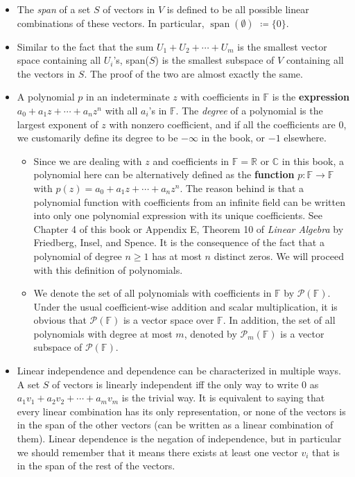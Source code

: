 \documentclass{article}
\newcommand{\R}{\mathbb{R}}
\newcommand{\C}{\mathbb{C}}
\newcommand{\F}{\mathbb{F}}
\newcommand{\s}{\operatorname{span}}
\begin{document}
\begin{itemize}
    \item The \textit{span} of a set $S$ of vectors in $V$ is defined to be all possible linear combinations of these vectors. In particular, $\s(\emptyset)$ $\coloneqq \{0\}$.
    \item Similar to the fact that the sum $U_1 + U_2 +\cdots+ U_m$ is the smallest vector space containing all $U_i$'s, span($S$) is the smallest subspace of $V$ containing all the vectors in $S$. The proof of the two are almost exactly the same.
    \item A polynomial $p$ in an indeterminate $z$ with coefficients in $\F$ is the \textbf{expression} $a_0 + a_1 z + \cdots + a_n z^n$ with all $a_i$'s in $\F$. The \textit{degree} of a polynomial is the largest exponent of $z$ with nonzero coefficient, and if all the coefficients are 0, we customarily define its degree to be $-\infty$ in the book, or $-1$ elsewhere.
    \begin{itemize}
        \item Since we are dealing with $z$ and coefficients in $\F = \R$ or $\C$ in this book, a polynomial here can be alternatively defined as the \textbf{function} $p: \F \rightarrow \F$ with $p(z) = a_0 + a_1 z + \cdots + a_n z^n$. The reason behind is that a polynomial function with coefficients from an infinite field can be written into only one polynomial expression with its unique coefficients. See Chapter 4 of this book or Appendix E, Theorem 10 of \textit{Linear Algebra} by Friedberg, Insel, and Spence. It is the consequence of the fact that a polynomial of degree $n \geq 1$ has at most $n$ distinct zeros. We will proceed with this definition of polynomials.
        \item We denote the set of all polynomials with coefficients in $\F$ by $\mathcal{P}(\F)$. Under the usual coefficient-wise addition and scalar multiplication, it is obvious that $\mathcal{P}(\F)$ is a vector space over $\F$. In addition, the set of all polynomials with degree at most $m$, denoted by $\mathcal{P}_m(\F)$ is a vector subspace of $\mathcal{P}(\F)$.
    \end{itemize}
    \item Linear independence and dependence can be characterized in multiple ways. A set $S$ of vectors is linearly independent iff the only way to write 0 as $a_1v_1 + a_2v_2 + \cdots +a_mv_m$ is the trivial way. It is equivalent to saying that every linear combination has its only representation, or none of the vectors is in the span of the other vectors (can be written as a linear combination of them). Linear dependence is the negation of independence, but in particular we should remember that it means there exists at least one vector $v_i$ that is in the span of the rest of the vectors.

\end{itemize}
\end{document}
